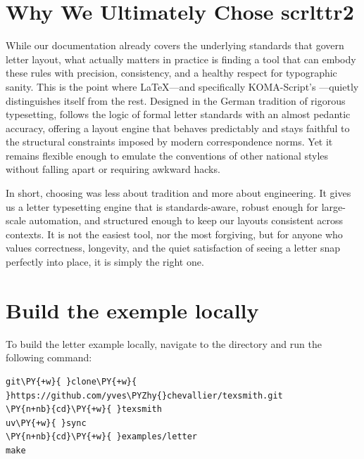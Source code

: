 \documentclass[a4paper,twoside]{article}
\begin{document}
\section{Why We Ultimately Chose scrlttr2}
While our documentation already covers the underlying standards that govern letter layout, what actually matters in practice is finding a tool that can embody these rules with precision, consistency, and a healthy respect for typographic sanity. This is the point where \LaTeX{}---and specifically KOMA-Script's ---quietly distinguishes itself from the rest. Designed in the German tradition of rigorous typesetting,  follows the logic of formal letter standards with an almost pedantic accuracy, offering a layout engine that behaves predictably and stays faithful to the structural constraints imposed by modern correspondence norms. Yet it remains flexible enough to emulate the conventions of other national styles without falling apart or requiring awkward hacks.

In short, choosing  was less about tradition and more about engineering. It gives us a letter typesetting engine that is standards-aware, robust enough for large-scale automation, and structured enough to keep our layouts consistent across contexts. It is not the easiest tool, nor the most forgiving, but for anyone who values correctness, longevity, and the quiet satisfaction of seeing a letter snap perfectly into place, it is simply the right one.
\section{Build the exemple locally}
To build the letter example locally, navigate to the  directory and run the following command:
\begin{tscode}[lang=bash, engine=pygments]
\begin{Verbatim}[commandchars=\\\{\},breaklines, breakanywhere, commandchars=\\\{\}]
git\PY{+w}{ }clone\PY{+w}{ }https://github.com/yves\PYZhy{}chevallier/texsmith.git
\PY{n+nb}{cd}\PY{+w}{ }texsmith
uv\PY{+w}{ }sync
\PY{n+nb}{cd}\PY{+w}{ }examples/letter
make
\end{Verbatim}
\end{tscode}
\end{document}
